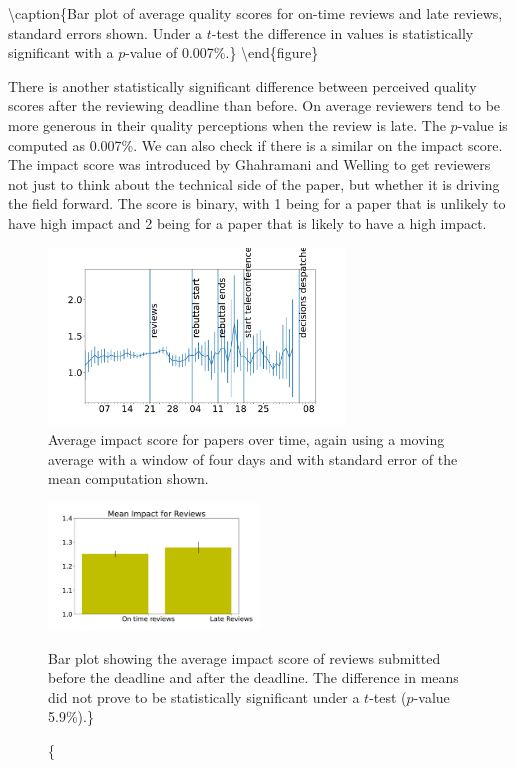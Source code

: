 \textbackslash caption\{Bar plot of average quality scores for on-time
reviews and late reviews, standard errors shown. Under a \(t\)-test the
difference in values is statistically significant with a \(p\)-value of
0.007\%.\} \label{review-quality-early-late}
\textbackslash end\{figure\}

There is another statistically significant difference between perceived
quality scores after the reviewing deadline than before. On average
reviewers tend to be more generous in their quality perceptions when the
review is late. The \(p\)-value is computed as 0.007\%. We can also
check if there is a similar on the impact score. The impact score was
introduced by Ghahramani and Welling to get reviewers not just to think
about the technical side of the paper, but whether it is driving the
field forward. The score is binary, with 1 being for a paper that is
unlikely to have high impact and 2 being for a paper that is likely to
have a high impact.

\begin{figure}[htb]
\includegraphics[width=0.70\textwidth]{diagrams/neurips/review-impact-time.pdf}


\caption{Average impact score for papers over time, again using a moving average with a window of four days and with standard error of the mean computation shown.}
\label{review-impact-time}
\end{figure}

\begin{figure}[htb]
\includegraphics[width=0.50\textwidth]{diagrams/neurips/review-impact-early-late.pdf}

\caption\{Bar plot showing the average impact score of
reviews submitted before the deadline and after the deadline. The
difference in means did not prove to be statistically significant under
a \(t\)-test (\(p\)-value 5.9\%).\} \label{review-impact-early-late}
\end{figure}


